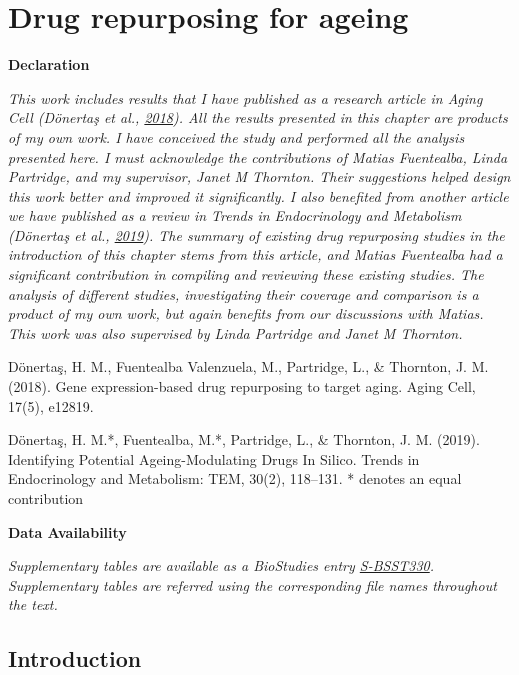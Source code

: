 \documentclass[12pt,twoside]{unicam}
\begin{document}
\hypertarget{drugChapter}{%
\chapter{Drug repurposing for ageing}\label{drugChapter}}

\small

\textbf{Declaration}

\emph{This work includes results that I have published as a research article in Aging Cell (Dönertaş et al., \protect\hyperlink{ref-Donertas2018}{2018}). All the results presented in this chapter are products of my own work. I have conceived the study and performed all the analysis presented here. I must acknowledge the contributions of Matias Fuentealba, Linda Partridge, and my supervisor, Janet M Thornton. Their suggestions helped design this work better and improved it significantly. I also benefited from another article we have published as a review in Trends in Endocrinology and Metabolism (Dönertaş et al., \protect\hyperlink{ref-Donertas2019}{2019}). The summary of existing drug repurposing studies in the introduction of this chapter stems from this article, and Matias Fuentealba had a significant contribution in compiling and reviewing these existing studies. The analysis of different studies, investigating their coverage and comparison is a product of my own work, but again benefits from our discussions with Matias. This work was also supervised by Linda Partridge and Janet M Thornton.}

Dönertaş, H. M., Fuentealba Valenzuela, M., Partridge, L., \& Thornton, J. M. (2018). Gene expression-based drug repurposing to target aging. Aging Cell, 17(5), e12819.

Dönertaş, H. M.*, Fuentealba, M.*, Partridge, L., \& Thornton, J. M. (2019). Identifying Potential Ageing-Modulating Drugs In Silico. Trends in Endocrinology and Metabolism: TEM, 30(2), 118--131.
* denotes an equal contribution

\textbf{Data Availability}

\emph{Supplementary tables are available as a BioStudies entry \href{https://www.ebi.ac.uk/biostudies/studies/S-BSST330}{S-BSST330}. Supplementary tables are referred using the corresponding file names throughout the text.}
\normalsize

\newpage

\hypertarget{introduction-3}{%
\section{Introduction}\label{introduction-3}}
\end{document}
